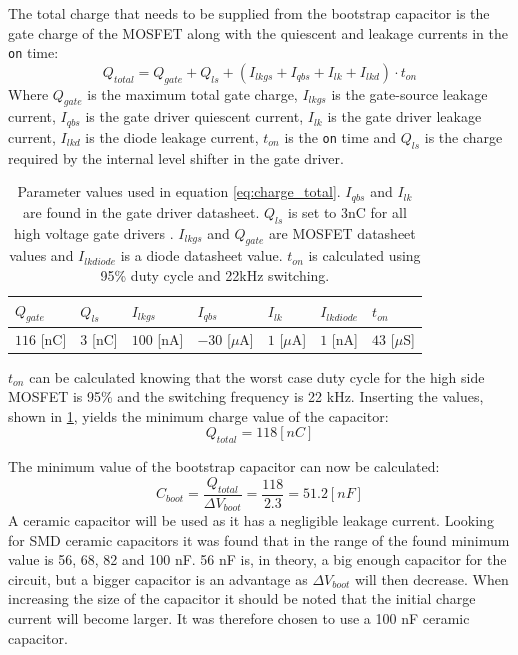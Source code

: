 The total charge that needs to be supplied from the bootstrap capacitor is the gate charge of the MOSFET along with the quiescent and leakage currents in the \texttt{on} time:
\begin{equation}
	Q_{total} = Q_{gate} + Q_{ls} + (I_{lkgs} + I_{qbs} + I_{lk} + I_{lkd}) \cdot t_{on}
	\label{eq:charge_total}
\end{equation}
Where $Q_{gate}$ is the maximum total gate charge, $I_{lkgs}$ is the gate-source leakage current, $I_{qbs}$ is the gate driver quiescent current, $I_{lk}$ is the gate driver leakage current, $I_{lkd}$ is the diode leakage current, $ t_{on}$ is the \texttt{on} time and $Q_{ls}$ is the charge required by the internal level shifter in the gate driver.
\begin{table}[h]
\centering
\begin{tabular}{|l|l|l|l|l|l|l|}
 \hline
 $Q_{gate}$ 	& $Q_{ls}$ 	& $I_{lkgs}$ 	& $I_{qbs}$ 		& $I_{lk}$ 			& $I_{lkdiode}$ 	& $t_{on}$ 		\\ 	\hline
 $116$ [nC]		& $3$ [nC]	& $100$ [nA]	&$-30$ [$\mu$A]		& $1$ [$\mu$A]		& $1$ [nA]			& $43$ [$\mu$S]	\\ 	\hline
\end{tabular}
\caption[Parameter values used to determine total charge.]{Parameter values used in equation \ref{eq:charge_total}. $I_{qbs}$ and $I_{lk}$ are found in the gate driver datasheet. $Q_{ls}$ is set to 3nC for all high voltage gate drivers \cite{bootstrap_ON}. $I_{lkgs}$ and $Q_{gate}$ are MOSFET datasheet values and $I_{lkdiode}$  is a diode datasheet value. $t_{on}$ is calculated using 95\% duty cycle and 22kHz switching.}
\label{tab:bootstrap_parameter}
\end{table}
$t_{on}$ can be calculated knowing that the worst case duty cycle for the high side MOSFET is 95\% and the switching frequency is 22 kHz.
Inserting the values, shown in \ref{tab:bootstrap_parameter}, yields the minimum charge value of the capacitor:
\begin{equation}
	Q_{total} = 118 [nC]
\end{equation}

The minimum value of the bootstrap capacitor can now be calculated:
\begin{equation}
	C_{boot} = \frac{Q_{total}}{\Delta V_{boot}} = \frac{118}{2.3} = 51.2 [nF]
\end{equation}
A ceramic capacitor will be used as it has a negligible leakage current. 
Looking for SMD ceramic capacitors it was found that in the range of the found minimum value is 56, 68, 82 and 100 nF.
56 nF is, in theory, a big enough capacitor for the circuit, but a bigger capacitor is an advantage as $\Delta V_{boot}$ will then decrease.
When increasing the size of the capacitor it should be noted that the initial charge current will become larger.
It was therefore chosen to use a 100 nF ceramic capacitor.

